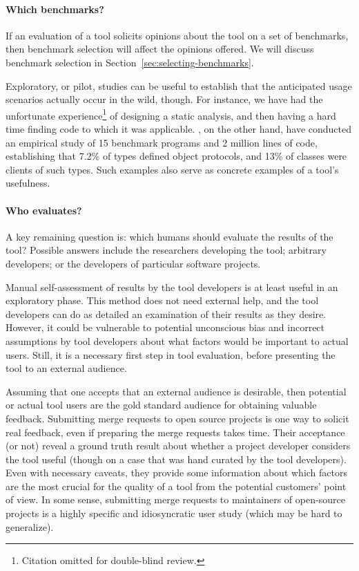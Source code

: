 \paragraph{Which benchmarks?} If an evaluation of a tool solicits opinions
about the tool on a set of benchmarks, then benchmark selection will affect
the opinions offered. We will discuss benchmark selection in 
Section~\ref{sec:selecting-benchmarks}.

Exploratory, 
or pilot, studies can be useful to establish that the
anticipated usage scenarios actually occur in the wild, though. For instance,
we have had the unfortunate experience\footnote{Citation omitted for double-blind review.} of designing a static analysis,
and then having a hard time finding code to which it was
applicable. \cite{beckman11:_empir_study_objec_protoc_wild}, on the
other hand, have conducted an empirical study of 15 benchmark programs
and 2 million lines of code, establishing that 7.2\% of types defined
object protocols, and 13\% of classes were clients of such types.
Such examples also serve as concrete examples of a tool's usefulness.


\paragraph{Who evaluates?}
A key remaining question is: which humans should evaluate the
results of the tool?  Possible answers include the researchers
developing the tool; arbitrary developers; or the developers of
particular software projects.

Manual self-assessment of results by the tool developers is at least
useful in an exploratory phase. This method does not need external
help, and the tool developers can do as detailed an examination of
their results as they desire. However, it could be vulnerable to
potential unconscious bias and incorrect assumptions by tool
developers about what factors would be important to actual
users. Still, it is a necessary first step in tool evaluation, before
presenting the tool to an external audience.

Assuming that one accepts that an external audience is desirable,
then potential or actual tool users are the gold standard audience for
obtaining valuable feedback. Submitting merge requests to open source
projects is one way to solicit real feedback, even if preparing the merge requests
takes time. Their acceptance (or
not) reveal a ground truth result about whether a project developer
considers the tool useful (though on a case that was hand curated by
the tool developers). Even with necessary caveats, they provide some information
about which factors are the most crucial for the quality of a tool
from the potential customers' point of view. 
In some sense, submitting merge requests to maintainers of open-source projects
is a highly specific and idiosyncratic user study (which may be hard to generalize).


